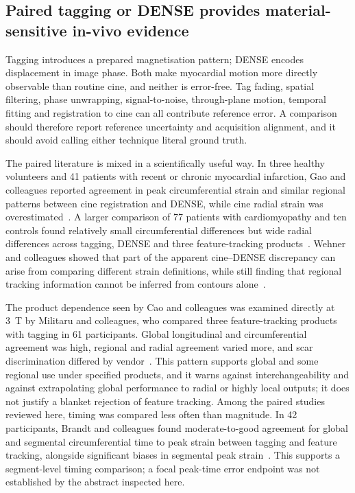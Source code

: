 \subsection{Paired tagging or DENSE provides material-sensitive in-vivo evidence}

Tagging introduces a prepared magnetisation pattern; DENSE encodes displacement in image phase. Both make myocardial motion more directly observable than routine cine, and neither is error-free. Tag fading, spatial filtering, phase unwrapping, signal-to-noise, through-plane motion, temporal fitting and registration to cine can all contribute reference error. A comparison should therefore report reference uncertainty and acquisition alignment, and it should avoid calling either technique literal ground truth.

The paired literature is mixed in a scientifically useful way. In three healthy volunteers and 41 patients with recent or chronic myocardial infarction, Gao and colleagues reported agreement in peak circumferential strain and similar regional patterns between cine registration and DENSE, while cine radial strain was overestimated~\cite{gao2014cine}. A larger comparison of 77 patients with cardiomyopathy and ten controls found relatively small circumferential differences but wide radial differences across tagging, DENSE and three feature-tracking products~\cite{cao2018}. Wehner and colleagues showed that part of the apparent cine--DENSE discrepancy can arise from comparing different strain definitions, while still finding that regional tracking information cannot be inferred from contours alone~\cite{wehner2018}.

The product dependence seen by Cao and colleagues was examined directly at 3~T by Militaru and colleagues, who compared three feature-tracking products with tagging in 61 participants. Global longitudinal and circumferential agreement was high, regional and radial agreement varied more, and scar discrimination differed by vendor~\cite{militaru2021}. This pattern supports global and some regional use under specified products, and it warns against interchangeability and against extrapolating global performance to radial or highly local outputs; it does not justify a blanket rejection of feature tracking. Among the paired studies reviewed here, timing was compared less often than magnitude. In 42 participants, Brandt and colleagues found moderate-to-good agreement for global and segmental circumferential time to peak strain between tagging and feature tracking, alongside significant biases in segmental peak strain~\cite{brandt2024}. This supports a segment-level timing comparison; a focal peak-time error endpoint was not established by the abstract inspected here.

